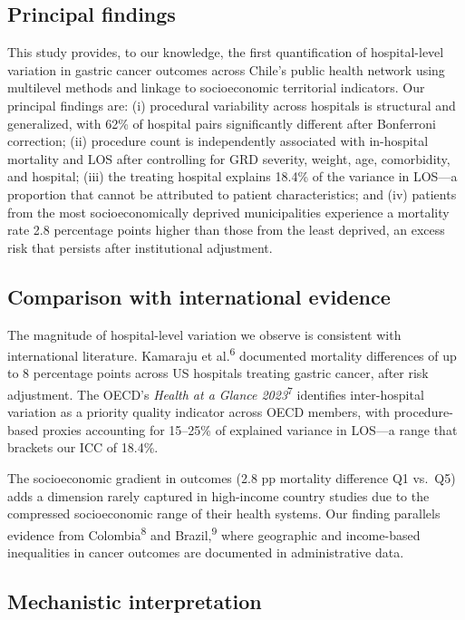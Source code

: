 \documentclass[10pt,twocolumn]{article}
\begin{document}
\subsection{Principal findings}

This study provides, to our knowledge, the first quantification of hospital-level
variation in gastric cancer outcomes across Chile's public health network using
multilevel methods and linkage to socioeconomic territorial indicators. Our
principal findings are: (i) procedural variability across hospitals is structural and
generalized, with 62\% of hospital pairs significantly different after Bonferroni
correction; (ii) procedure count is independently associated with in-hospital
mortality and LOS after controlling for GRD severity, weight, age, comorbidity, and
hospital; (iii) the treating hospital explains 18{.}4\% of the variance in LOS—a
proportion that cannot be attributed to patient characteristics; and (iv) patients
from the most socioeconomically deprived municipalities experience a mortality rate
2{.}8 percentage points higher than those from the least deprived, an excess risk
that persists after institutional adjustment.

\subsection{Comparison with international evidence}

The magnitude of hospital-level variation we observe is consistent with international
literature. Kamaraju et al.\textsuperscript{6} documented mortality differences of
up to 8 percentage points across US hospitals treating gastric cancer, after risk
adjustment. The OECD's \textit{Health at a Glance 2023}\textsuperscript{7} identifies
inter-hospital variation as a priority quality indicator across OECD members, with
procedure-based proxies accounting for 15–25\% of explained variance in LOS—a range
that brackets our ICC of 18{.}4\%.

The socioeconomic gradient in outcomes (2{.}8 pp mortality difference Q1 vs.\ Q5)
adds a dimension rarely captured in high-income country studies due to the
compressed socioeconomic range of their health systems. Our finding parallels evidence
from Colombia\textsuperscript{8} and Brazil,\textsuperscript{9} where geographic and
income-based inequalities in cancer outcomes are documented in administrative data.

\subsection{Mechanistic interpretation}
\end{document}
